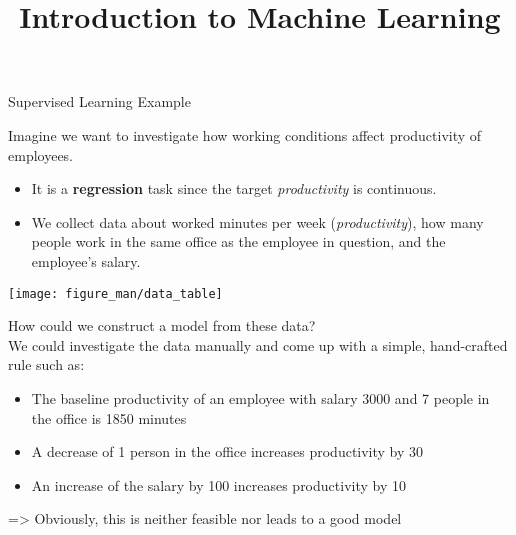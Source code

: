 \documentclass[11pt,compress,t,notes=noshow, xcolor=table]{beamer}
\title{Introduction to Machine Learning}
\begin{document}



\begin{vbframe}{Supervised Learning Example}

Imagine we want to investigate how working conditions affect productivity of employees.

\begin{itemize}
	\item It is a \textbf{regression} task since the target \emph{productivity} is continuous.
	\item We collect data about worked minutes 
per week (\emph{productivity}), how many people work in the same office as the 
employee in question, and the employee's salary.
\end{itemize}
  
\begin{center}
  \texttt{[image: figure\_man/data\_table]} 
\end{center}

\framebreak

How could we construct a model from these data?\\[1ex]

We could investigate the data manually and come up with a simple, hand-crafted rule such as:


\lz
    
\begin{itemize}
\item The baseline productivity of an employee with salary 3000 and 7 people in the office is 1850 minutes
\item A decrease of 1 person in the office increases productivity by 30 
\item An increase of the salary by 100 increases productivity by 10
\end{itemize}

\lz

=> Obviously, this is neither feasible nor leads to a good model
\end{vbframe}
\end{document}
